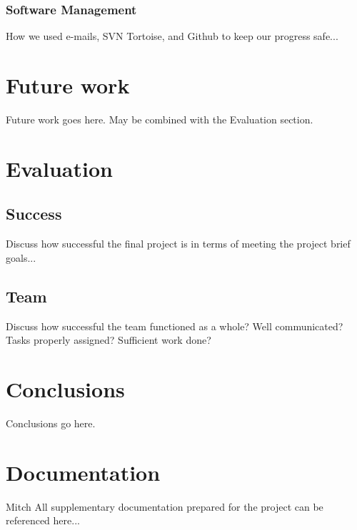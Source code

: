 \documentclass[oneside]{ecsgdp}         %
\begin{document}
\subsection{Software Management}
How we used e-mails, SVN Tortoise, and Github to keep our progress safe...


\chapter{Future work}
Future work goes here. May be combined with the Evaluation section.

\chapter{Evaluation}

\section{Success}
Discuss how successful the final project is in terms of meeting the project brief goals...

\section{Team}
Discuss how successful the team functioned as a whole? Well communicated? Tasks properly assigned? Sufficient work done?

\chapter{Conclusions}
Conclusions go here.

\chapter{Documentation}
Mitch
All supplementary documentation prepared for the project can be referenced here...

\end{document}

